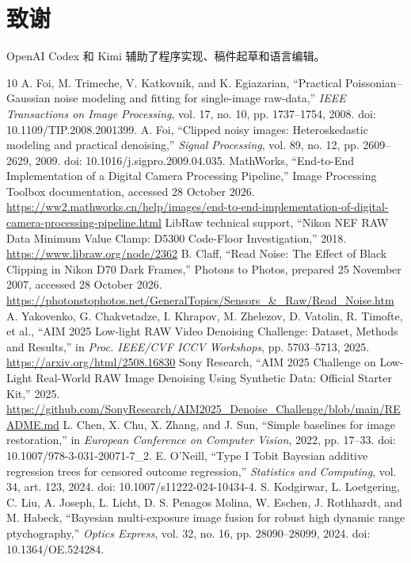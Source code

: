 \documentclass[10pt,twocolumn,journal]{IEEEtran}
\begin{document}
\section*{致谢}
OpenAI Codex 和 Kimi 辅助了程序实现、稿件起草和语言编辑。

\begin{thebibliography}{10}
\fontsize{7.8}{8.1}\selectfont
\setlength{\itemsep}{0pt}
 A. Foi, M. Trimeche, V. Katkovnik, and K. Egiazarian, ``Practical Poissonian--Gaussian noise modeling and fitting for single-image raw-data,'' \emph{IEEE Transactions on Image Processing}, vol. 17, no. 10, pp. 1737--1754, 2008. doi: 10.1109/TIP.2008.2001399.
 A. Foi, ``Clipped noisy images: Heteroskedastic modeling and practical denoising,'' \emph{Signal Processing}, vol. 89, no. 12, pp. 2609--2629, 2009. doi: 10.1016/j.sigpro.2009.04.035.
 MathWorks, ``End-to-End Implementation of a Digital Camera Processing Pipeline,'' Image Processing Toolbox documentation, accessed 28 October 2026. \url{https://ww2.mathworks.cn/help/images/end-to-end-implementation-of-digital-camera-processing-pipeline.html}
 LibRaw technical support, ``Nikon NEF RAW Data Minimum Value Clamp: D5300 Code-Floor Investigation,'' 2018. \url{https://www.libraw.org/node/2362}
 B. Claff, ``Read Noise: The Effect of Black Clipping in Nikon D70 Dark Frames,'' Photons to Photos, prepared 25 November 2007, accessed 28 October 2026. \url{https://photonstophotos.net/GeneralTopics/Sensors_&_Raw/Read_Noise.htm}
 A. Yakovenko, G. Chakvetadze, I. Khrapov, M. Zhelezov, D. Vatolin, R. Timofte, et al., ``AIM 2025 Low-light RAW Video Denoising Challenge: Dataset, Methods and Results,'' in \emph{Proc. IEEE/CVF ICCV Workshops}, pp. 5703--5713, 2025. \url{https://arxiv.org/html/2508.16830}
 Sony Research, ``AIM 2025 Challenge on Low-Light Real-World RAW Image Denoising Using Synthetic Data: Official Starter Kit,'' 2025. \url{https://github.com/SonyResearch/AIM2025_Denoise_Challenge/blob/main/README.md}
 L. Chen, X. Chu, X. Zhang, and J. Sun, ``Simple baselines for image restoration,'' in \emph{European Conference on Computer Vision}, 2022, pp. 17--33. doi: 10.1007/978-3-031-20071-7\_2.
 E. O'Neill, ``Type I Tobit Bayesian additive regression trees for censored outcome regression,'' \emph{Statistics and Computing}, vol. 34, art. 123, 2024. doi: 10.1007/s11222-024-10434-4.
 S. Kodgirwar, L. Loetgering, C. Liu, A. Joseph, L. Licht, D. S. Penagos Molina, W. Eschen, J. Rothhardt, and M. Habeck, ``Bayesian multi-exposure image fusion for robust high dynamic range ptychography,'' \emph{Optics Express}, vol. 32, no. 16, pp. 28090--28099, 2024. doi: 10.1364/OE.524284.

\end{thebibliography}
\end{document}
